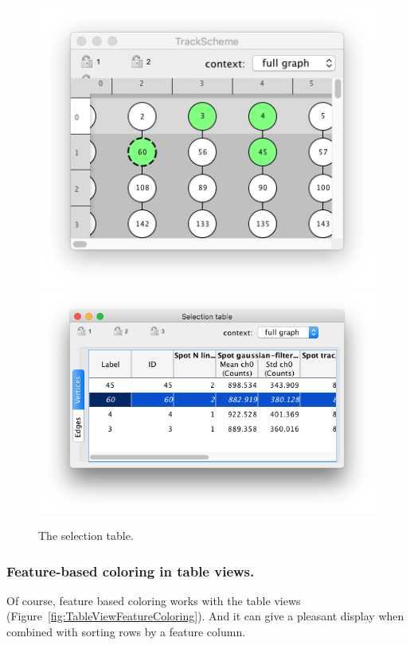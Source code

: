 \begin{figure}
    \centering
    \null\hfill
    \includegraphics[height=0.23\textheight]{figures/Mastodon_TableView7.png}
    \hfill
    \includegraphics[height=0.23\textheight]{figures/Mastodon_TableView8.png}
    \hfill\null
    
    \caption{The selection table.  }
    \label{fig:SelectionTable}
\end{figure}

\subsubsection{Feature-based coloring in table views.}

Of course, feature based coloring works with the table views (Figure~\ref{fig:TableViewFeatureColoring}).
And it can give a pleasant display when combined with sorting rows by a feature column.


